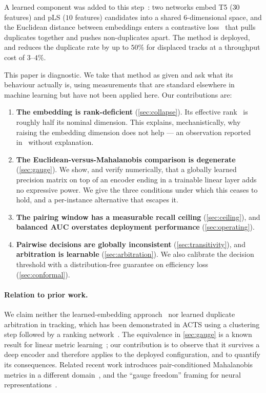 \documentclass[11pt]{article}
\begin{document}
A learned component was added to this step~\cite{dp2025048}: two networks embed
T5 ($30$ features) and pLS ($10$ features) candidates into a shared $6$-dimensional
space, and the Euclidean distance between embeddings enters a contrastive
loss~\cite{hadsell2006} that pulls duplicates together and pushes non-duplicates
apart. The method is deployed, and reduces the duplicate rate by up to $50\%$
for displaced tracks at a throughput cost of $3$--$4\%$.

This paper is diagnostic. We take that method as given and ask what its
behaviour actually is, using measurements that are standard elsewhere in machine
learning but have not been applied here. Our contributions are:

\begin{enumerate}
\item \textbf{The embedding is rank-deficient} (\cref{sec:collapse}). Its
  effective rank~\cite{rankme} is roughly half its nominal dimension. This
  explains, mechanistically, why raising the embedding dimension does not help
  --- an observation reported in~\cite{dp2025048} without explanation.
\item \textbf{The Euclidean-versus-Mahalanobis comparison is degenerate}
  (\cref{sec:gauge}). We show, and verify numerically, that a globally learned
  precision matrix on top of an encoder ending in a trainable linear layer adds
  no expressive power. We give the three conditions under which this ceases to
  hold, and a per-instance alternative that escapes it.
\item \textbf{The pairing window has a measurable recall ceiling}
  (\cref{sec:ceiling}), and \textbf{balanced AUC overstates deployment
  performance} (\cref{sec:operating}).
\item \textbf{Pairwise decisions are globally inconsistent}
  (\cref{sec:transitivity}), and \textbf{arbitration is learnable}
  (\cref{sec:arbitration}). We also calibrate the decision threshold with a
  distribution-free guarantee on efficiency loss (\cref{sec:conformal}).
\end{enumerate}

\paragraph{Relation to prior work.}
We claim neither the learned-embedding approach~\cite{dp2025048} nor learned
duplicate arbitration in tracking, which has been demonstrated in ACTS using a
clustering step followed by a ranking network~\cite{allaire2025,allaire2023}.
The equivalence in \cref{sec:gauge} is a known result for linear metric
learning~\cite{lmnn,kulis2013,bellet2013}; our contribution is to observe that it
survives a deep encoder and therefore applies to the deployed configuration, and
to quantify its consequences. Related recent work introduces pair-conditioned
Mahalanobis metrics in a different domain~\cite{pamd}, and the ``gauge freedom''
framing for neural representations~\cite{cain2026}.
\end{document}
